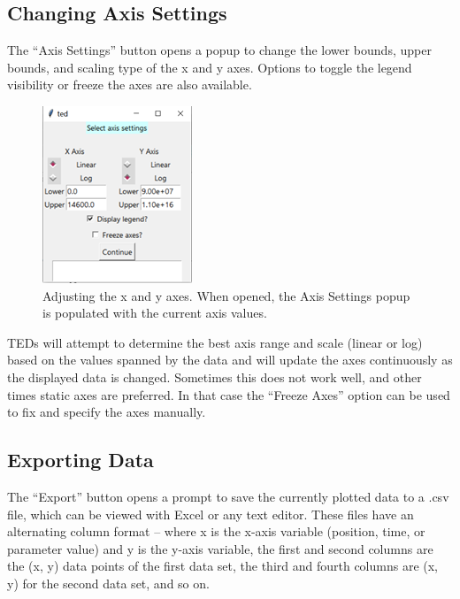 \documentclass[11pt,letterpaper,titlepage]{article}
\begin{document}
		\subsection {Changing Axis Settings}
		
		\par The “Axis Settings” button opens a popup to change the lower bounds, upper bounds, and scaling type of the x and y axes. Options to toggle the legend visibility or freeze the axes are also available.
		
		\begin{figure}[H]
			\label{fig:axis_settings_example}
			\centering
			\includegraphics[scale=1.2]{"axis_settings_example"}
			\caption{Adjusting the x and y axes. When opened, the Axis Settings popup is populated with the current axis values.}
		\end{figure}
	
		\par TEDs will attempt to determine the best axis range and scale (linear or log) based on the values spanned by the data and will update the axes continuously as the displayed data is changed. Sometimes this does not work well, and other times static axes are preferred. In that case the “Freeze Axes” option can be used to fix and specify the axes manually.
		
		\subsection {Exporting Data}
		
		\par The “Export” button opens a prompt to save the currently plotted data to a .csv file, which can be viewed with Excel or any text editor. These files have an alternating column format – where x is the x-axis variable (position, time, or parameter value) and y is the y-axis variable, the first and second columns are the (x, y) data points of the first data set, the third and fourth columns are (x, y) for the second data set, and so on.
		
\end{document}
